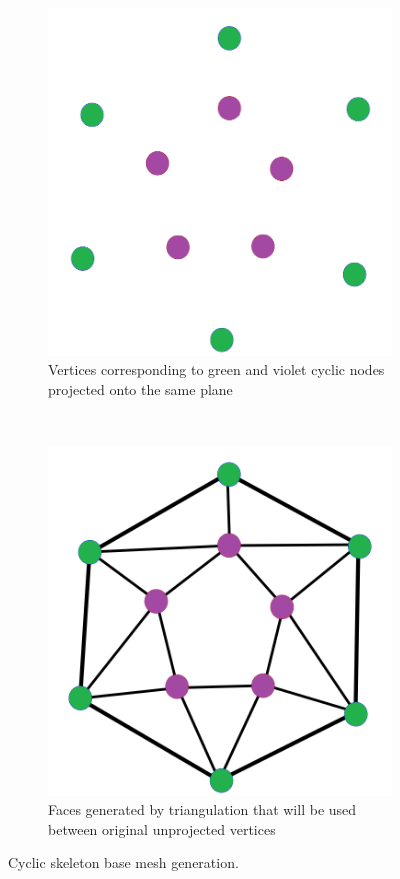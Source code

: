 \begin{figure}[ht]
\begin{subfigure}[b]{0.4\linewidth}
        \end{subfigure}
        \\ %
        \begin{subfigure}[b]{0.4\linewidth}
        \centering
			\includegraphics[width=0.8\linewidth]{images/del_tria_1}
            \caption{Vertices corresponding to green and violet cyclic nodes projected onto the same plane}
            \label{fig:cycle_del_before}
        \end{subfigure}
        ~ %
        \begin{subfigure}[b]{0.4\linewidth}
        \centering
			\includegraphics[width=0.8\linewidth]{images/del_tria_2}
            \caption{Faces generated by triangulation that will be used between original unprojected vertices}
            \label{fig:cycle_del_after}
        \end{subfigure}
        \caption{Cyclic skeleton base mesh generation.}
        \label{fig:cycle_ilu}
\end{figure}
